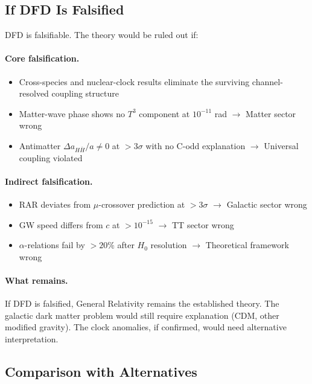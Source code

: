 \subsection{If DFD Is Falsified}\label{sec:conclusions-if-falsified}

DFD is falsifiable. The theory would be ruled out if:

\paragraph{Core falsification.}
\begin{itemize}
\item Cross-species and nuclear-clock results eliminate the surviving channel-resolved coupling structure
\item Matter-wave phase shows no $T^3$ component at $10^{-11}$ rad $\to$ Matter sector wrong
\item Antimatter $\Delta a_{H\bar{H}}/a \neq 0$ at $>3\sigma$ with no C-odd explanation $\to$ Universal coupling violated
\end{itemize}

\paragraph{Indirect falsification.}
\begin{itemize}
\item RAR deviates from $\mu$-crossover prediction at $>3\sigma$ $\to$ Galactic sector wrong
\item GW speed differs from $c$ at $>10^{-15}$ $\to$ TT sector wrong
\item $\alpha$-relations fail by $>20\%$ after $H_0$ resolution $\to$ Theoretical framework wrong
\end{itemize}

\paragraph{What remains.}
If DFD is falsified, General Relativity remains the established theory. The galactic dark matter problem would still require explanation (CDM, other modified gravity). The clock anomalies, if confirmed, would need alternative interpretation.

\subsection{Comparison with Alternatives}\label{sec:conclusions-alternatives}

